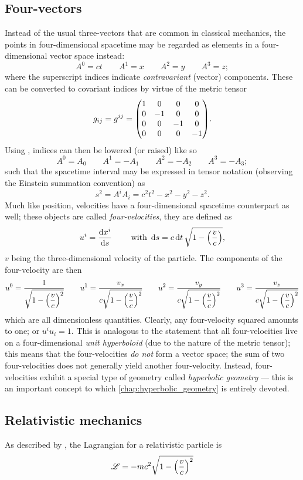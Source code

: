 \subsection{Four-vectors}
Instead of the usual three-vectors that are common in classical mechanics, the points in four-dimensional spacetime may be regarded as elements in a four-dimensional vector space instead:
\begin{equation}
    A^0 = ct\qquad A^1 = x \qquad A^2 = y \qquad A^3 = z;
    \label{eq:four-vector}
\end{equation}
where the superscript indices indicate \emph{contravariant} (vector) components. These can be converted to covariant indices by virtue of the metric tensor 
\[g_{ij} = g^{ij} = \mqty(\dmat[0]{1, -1, -1, -1}).\]
Using , indices can then be lowered (or raised) like so
\[ A^0 = A_0\qquad A^1 = -A_1 \qquad A^2 = -A_2 \qquad A^3 = -A_3; \]
such that the spacetime interval may be expressed in tensor notation (observing the Einstein summation convention) as
\[ s^2 = A^i A_i = c^2t^2 - x^2 - y^2 - z^2.\]
Much like position, velocities have a four-dimensional spacetime counterpart as well; these objects are called \emph{four-velocities}, they are defined as \cite{Landau1971}
\[ u^i = \dv{x^i}{s} \qquad \text{ with } \dd{s} = c\dd{t} \sqrt{1 - \qty(\frac{v}{c})},\]
\(v\) being the three-dimensional velocity of the particle. The components of the four-velocity are then
\[ 
u^0 = \frac{\displaystyle 1}{\displaystyle \sqrt{1 - \qty(\frac{v}{c})^2}} 
\qquad  u^1 = \frac{\displaystyle v_x}{\displaystyle c\sqrt{1 - \qty(\frac{v}{c})^2}}
\qquad  u^2 = \frac{\displaystyle v_y}{\displaystyle c\sqrt{1 - \qty(\frac{v}{c})^2}}
\qquad  u^3 = \frac{\displaystyle v_z}{\displaystyle c\sqrt{1 - \qty(\frac{v}{c})^2}}
\]
which are all dimensionless quantities. Clearly, any four-velocity squared amounts to one; or \(u^i u_i = 1\). This is analogous to the statement that all four-velocities live on a four-dimensional \emph{unit hyperboloid} (due to the nature of the metric tensor); this means that the four-velocities \emph{do not} form a vector space; the sum of two four-velocities does not generally yield another four-velocity. Instead, four-velocities exhibit a special type of geometry called \emph{hyperbolic geometry} --- this is an important concept to which \cref{chap:hyperbolic_geometry} is entirely devoted.

\subsection{Relativistic mechanics}
As described by \citet{Landau1971}, the Lagrangian for a relativistic particle is 
\[\mathscr{L} = -mc^2\sqrt{1 - \qty(\frac{v}{c})^2}\]

